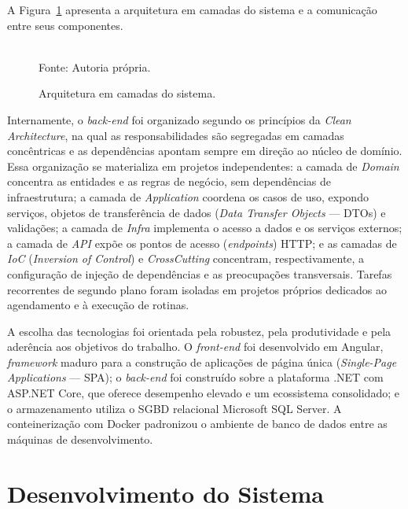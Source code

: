 A Figura~\ref{fig:arquitetura} apresenta a arquitetura em camadas do sistema e a comunicação entre seus componentes.

\begin{figure}[H]
  \centering
  \framebox[0.85\textwidth]{\rule{0pt}{7cm}}%
  \caption{Arquitetura em camadas do sistema.}
  \label{fig:arquitetura}\\
  {\footnotesize Fonte: Autoria própria.}
\end{figure}

Internamente, o \textit{back-end} foi organizado segundo os princípios da \textit{Clean Architecture}, na qual as responsabilidades são segregadas em camadas concêntricas e as dependências apontam sempre em direção ao núcleo de domínio. %
Essa organização se materializa em projetos independentes: a camada de \textit{Domain} concentra as entidades e as regras de negócio, sem dependências de infraestrutura; a camada de \textit{Application} coordena os casos de uso, expondo serviços, objetos de transferência de dados (\textit{Data Transfer Objects} — DTOs) e validações; a camada de \textit{Infra} implementa o acesso a dados e os serviços externos; a camada de \textit{API} expõe os pontos de acesso (\textit{endpoints}) HTTP; e as camadas de \textit{IoC} (\textit{Inversion of Control}) e \textit{CrossCutting} concentram, respectivamente, a configuração de injeção de dependências e as preocupações transversais. Tarefas recorrentes de segundo plano foram isoladas em projetos próprios dedicados ao agendamento e à execução de rotinas.

A escolha das tecnologias foi orientada pela robustez, pela produtividade e pela aderência aos objetivos do trabalho. O \textit{front-end} foi desenvolvido em Angular, \textit{framework} maduro para a construção de aplicações de página única (\textit{Single-Page Applications} — SPA); o \textit{back-end} foi construído sobre a plataforma .NET com ASP.NET Core, que oferece desempenho elevado e um ecossistema consolidado; e o armazenamento utiliza o SGBD relacional Microsoft SQL Server. A conteinerização com Docker padronizou o ambiente de banco de dados entre as máquinas de desenvolvimento.

\section{Desenvolvimento do Sistema}\label{sec:desenvolvimento}
